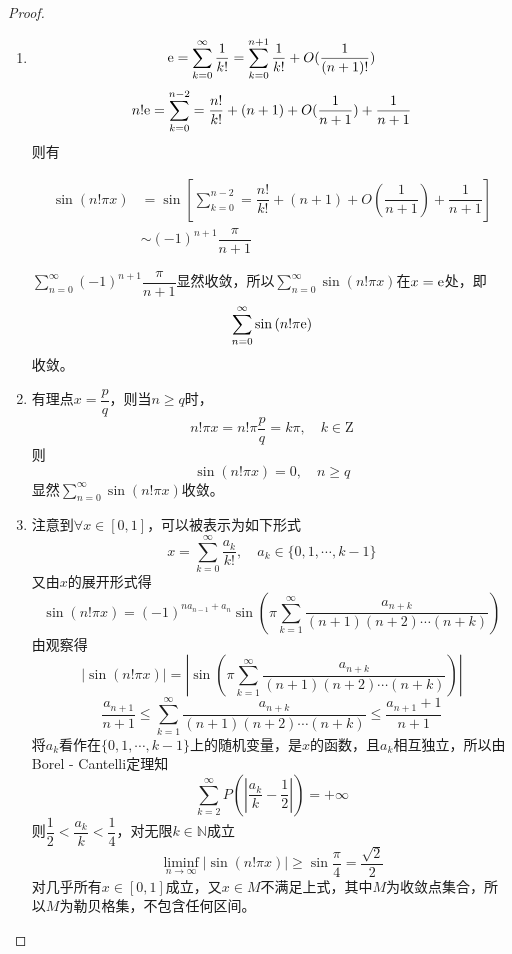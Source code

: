 \begin{proof}

    \begin{enumerate}

        \item 
            \[\mathrm{e} = \sum\limits_{k = 0}^{\infty}{\dfrac{1}{k!}} = \sum\limits_{k = 0}^{n + 1}{\dfrac{1}{k!}} + O(\dfrac{1}{(n + 1)!})\]
            \[n! \mathrm{e} = \sum\limits_{k = 0}^{n - 2} = \dfrac{n!}{k!} + (n + 1) + O(\dfrac{1}{n + 1}) + \dfrac{1}{n + 1}\]
            则有

            \begin{align*}
                \sin{(n!\pi x)} & = \sin{\left[ \sum\limits_{k = 0}^{n - 2} = \dfrac{n!}{k!} + (n + 1) + O(\dfrac{1}{n + 1}) + \dfrac{1}{n + 1} \right]} \\
                & \sim (-1)^{n + 1} \dfrac{\pi}{n + 1}
            \end{align*}
            
            $\sum\limits_{n = 0}^{\infty}{(-1)^{n + 1} \dfrac{\pi}{n + 1}}$显然收敛，所以$\sum\limits_{n = 0}^{\infty}{\sin{(n!\pi x)}}$在$x = \mathrm{e}$处，即
            \[\sum\limits_{n = 0}^{\infty}{\sin{(n!\pi \mathrm{e})}}\]
            收敛。
        
        \item 
            有理点$x = \dfrac{p}{q}$，则当$n \geq q$时，
            \[n!\pi x = n! \pi \dfrac{p}{q} = k\pi, \quad k \in \mathrm{Z}\]
            则
            \[\sin{(n!\pi x)} = 0, \quad n \geq q\]
            显然$\sum\limits_{n = 0}^{\infty}{\sin{(n!\pi x)}}$收敛。

        \item 
            注意到$\forall x \in [0, 1]$，可以被表示为如下形式
            \[x = \sum\limits_{k = 0}^{\infty}{\dfrac{a_k}{k!}}, \quad a_k \in \{0, 1, \cdots, k - 1\}\]
            又由$x$的展开形式得
            \[\sin{(n!\pi x)} = (-1)^{na_{n - 1} + a_n} \sin{\left( \pi \sum\limits_{k  = 1}^{\infty}{\dfrac{a_{n + k}}{(n + 1)(n + 2) \cdots(n + k)}} \right)}\]
            由观察得
            \[ |\sin{(n!\pi x)}| = \left| \sin{\left( \pi \sum\limits_{k  = 1}^{\infty}{\dfrac{a_{n + k}}{(n + 1)(n + 2) \cdots(n + k)}} \right)} \right|\]
            \[\dfrac{a_{n + 1}}{n + 1} \leq \sum\limits_{k  = 1}^{\infty}{\dfrac{a_{n + k}}{(n + 1)(n + 2) \cdots (n + k)}} \leq \dfrac{a_{n + 1} + 1}{n + 1} \]
            将$a_k$看作在$\{0, 1, \cdots, k - 1\}$上的随机变量，是$x$的函数，且$a_k$相互独立，所以由\textup{Borel - Cantelli}定理知
            \[\sum\limits_{k = 2}^{\infty}{P \left( \left| \dfrac{a_k}{k} - \dfrac{1}{2} \right| \right)} = +\infty\]
            则$\dfrac{1}{2} < \dfrac{a_k}{k} < \dfrac{1}{4}$，对无限$k \in \mathbb{N}$成立
            \[\liminf_{n \to \infty}{|\sin{(n!\pi x)}|} \geq \sin{\dfrac{\pi}{4}} = \dfrac{\sqrt{2}}{2}\]
            对几乎所有$x \in [0, 1]$成立，又$x \in M$不满足上式，其中$M$为收敛点集合，所以$M$为勒贝格集，不包含任何区间。

       \end{enumerate}

\end{proof}

